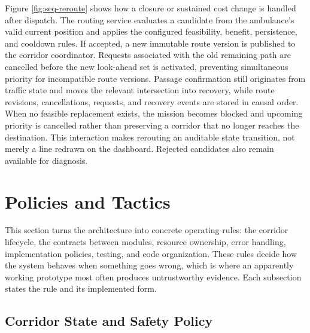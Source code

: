 Figure \ref{fig:seq-reroute} shows how a closure or sustained cost change is handled after dispatch. The routing service evaluates a candidate from the ambulance's valid current position and applies the configured feasibility, benefit, persistence, and cooldown rules. If accepted, a new immutable route version is published to the corridor coordinator. Requests associated with the old remaining path are cancelled before the new look-ahead set is activated, preventing simultaneous priority for incompatible route versions. Passage confirmation still originates from traffic state and moves the relevant intersection into recovery, while route revisions, cancellations, requests, and recovery events are stored in causal order. When no feasible replacement exists, the mission becomes blocked and upcoming priority is cancelled rather than preserving a corridor that no longer reaches the destination. This interaction makes rerouting an auditable state transition, not merely a line redrawn on the dashboard. Rejected candidates also remain available for diagnosis.

\section{Policies and Tactics}

This section turns the architecture into concrete operating rules: the corridor lifecycle, the contracts between modules, resource ownership, error handling, implementation policies, testing, and code organization. These rules decide how the system behaves when something goes wrong, which is where an apparently working prototype most often produces untrustworthy evidence. Each subsection states the rule and its implemented form.

\subsection{Corridor State and Safety Policy}
\label{sec:corridor-state}

